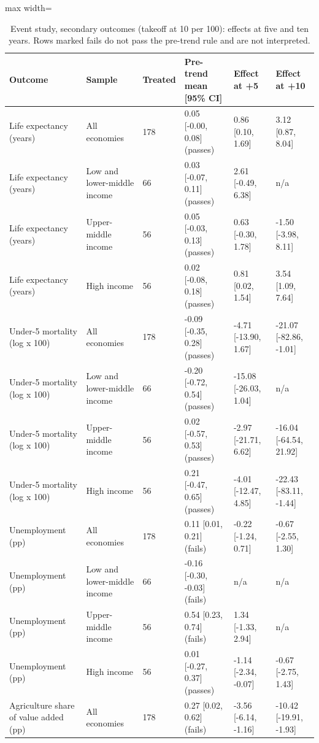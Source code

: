 \begin{table}[!ht]\centering\footnotesize
\caption{Event study, secondary outcomes (takeoff at 10 per 100): effects at five and ten years. Rows marked fails do not pass the pre-trend rule and are not interpreted.}\label{tab:essec}
\begin{adjustbox}{max width=\linewidth}\begin{tabular}{@{}llllll@{}}\toprule
Outcome & Sample & Treated & Pre-trend mean [95\% CI] & Effect at +5 & Effect at +10 \\ \midrule
Life expectancy (years) & All economies & 178 & 0.05 [-0.00, 0.08] (passes) & 0.86 [0.10, 1.69] & 3.12 [0.87, 8.04] \\
Life expectancy (years) & Low and lower-middle income & 66 & 0.03 [-0.07, 0.11] (passes) & 2.61 [-0.49, 6.38] & n/a \\
Life expectancy (years) & Upper-middle income & 56 & 0.05 [-0.03, 0.13] (passes) & 0.63 [-0.30, 1.78] & -1.50 [-3.98, 8.11] \\
Life expectancy (years) & High income & 56 & 0.02 [-0.08, 0.18] (passes) & 0.81 [0.02, 1.54] & 3.54 [1.09, 7.64] \\
Under-5 mortality (log x 100) & All economies & 178 & -0.09 [-0.35, 0.28] (passes) & -4.71 [-13.90, 1.67] & -21.07 [-82.86, -1.01] \\
Under-5 mortality (log x 100) & Low and lower-middle income & 66 & -0.20 [-0.72, 0.54] (passes) & -15.08 [-26.03, 1.04] & n/a \\
Under-5 mortality (log x 100) & Upper-middle income & 56 & 0.02 [-0.57, 0.53] (passes) & -2.97 [-21.71, 6.62] & -16.04 [-64.54, 21.92] \\
Under-5 mortality (log x 100) & High income & 56 & 0.21 [-0.47, 0.65] (passes) & -4.01 [-12.47, 4.85] & -22.43 [-83.11, -1.44] \\
Unemployment (pp) & All economies & 178 & 0.11 [0.01, 0.21] (fails) & -0.22 [-1.24, 0.71] & -0.67 [-2.55, 1.30] \\
Unemployment (pp) & Low and lower-middle income & 66 & -0.16 [-0.30, -0.03] (fails) & n/a & n/a \\
Unemployment (pp) & Upper-middle income & 56 & 0.54 [0.23, 0.74] (fails) & 1.34 [-1.33, 2.94] & n/a \\
Unemployment (pp) & High income & 56 & 0.01 [-0.27, 0.37] (passes) & -1.14 [-2.34, -0.07] & -0.67 [-2.75, 1.43] \\
Agriculture share of value added (pp) & All economies & 178 & 0.27 [0.02, 0.62] (fails) & -3.56 [-6.14, -1.16] & -10.42 [-19.91, -1.93] \\

\end{tabular}
\end{adjustbox}
\end{table}
